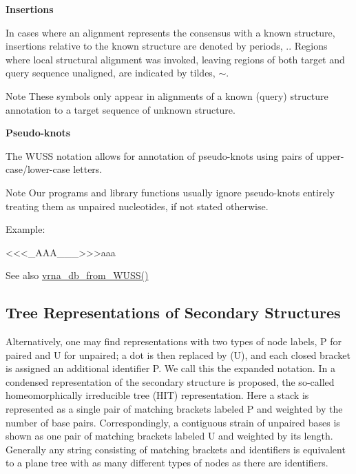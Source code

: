 \begin{DoxyItemize}
\item {\bfseries Insertions}

In cases where an alignment represents the consensus with a known structure, insertions relative to the known structure are denoted by periods, {\ttfamily .}. Regions where local structural alignment was invoked, leaving regions of both target and query sequence unaligned, are indicated by tildes, {\ttfamily $\sim$}. \begin{DoxyNote}{Note}
These symbols only appear in alignments of a known (query) structure annotation to a target sequence of unknown structure.
\end{DoxyNote}

\item {\bfseries Pseudo-\/knots}

The W\+U\+SS notation allows for annotation of pseudo-\/knots using pairs of upper-\/case/lower-\/case letters. \begin{DoxyNote}{Note}
Our programs and library functions usually ignore pseudo-\/knots entirely treating them as unpaired nucleotides, if not stated otherwise.
\end{DoxyNote}
Example\+:
\begin{DoxyCode}
<<<\_AAA\_\_\_>>>aaa
\end{DoxyCode}
 
\end{DoxyItemize}

\begin{DoxySeeAlso}{See also}
\hyperlink{group__struct__utils__dot__bracket_ga02ca70cffb2d864f7b2d95d92218bae0}{vrna\+\_\+db\+\_\+from\+\_\+\+W\+U\+S\+S()}
\end{DoxySeeAlso}
\hypertarget{rna_structure_notations_sec_structure_representations_tree}{}\subsection{Tree Representations of Secondary Structures}\label{rna_structure_notations_sec_structure_representations_tree}
Alternatively, one may find representations with two types of node labels, \textquotesingle{}P\textquotesingle{} for paired and \textquotesingle{}U\textquotesingle{} for unpaired; a dot is then replaced by \textquotesingle{}(U)\textquotesingle{}, and each closed bracket is assigned an additional identifier \textquotesingle{}P\textquotesingle{}. We call this the expanded notation. In \cite{fontana:1993b} a condensed representation of the secondary structure is proposed, the so-\/called homeomorphically irreducible tree (H\+IT) representation. Here a stack is represented as a single pair of matching brackets labeled \textquotesingle{}P\textquotesingle{} and weighted by the number of base pairs. Correspondingly, a contiguous strain of unpaired bases is shown as one pair of matching brackets labeled \textquotesingle{}U\textquotesingle{} and weighted by its length. Generally any string consisting of matching brackets and identifiers is equivalent to a plane tree with as many different types of nodes as there are identifiers.

